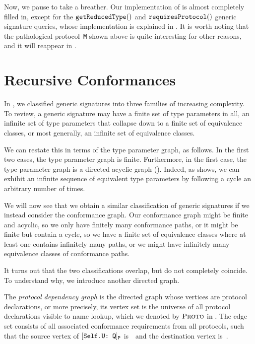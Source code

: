 \documentclass[../generics]{subfiles}
\begin{document}
Now, we pause to take a breather. Our implementation of  is almost completely filled in, except for the $\texttt{getReducedType}()$ and $\texttt{requiresProtocol}()$ generic signature queries, whose implementation is explained in . It is worth noting that the pathological protocol~\texttt{M} shown above is quite interesting for other reasons, and it will reappear in .

\section{Recursive Conformances}\label{recursive conformances}

In , we classified generic signatures into three families of increasing complexity. To review, a generic signature may have a finite set of type parameters in all, an infinite set of type parameters that collapse down to a finite set of equivalence classes, or most generally, an infinite set of equivalence classes.

We can restate this in terms of the type parameter graph, as follows. In the first two cases, the type parameter graph is finite. Furthermore, in the first case, the type parameter graph is a directed acyclic graph (). Indeed, as  shows, we can exhibit an infinite sequence of equivalent type parameters by following a cycle an arbitrary number of times.

We will now see that we obtain a similar classification of generic signatures if we instead consider the conformance graph. Our conformance graph might be finite and acyclic, so we only have finitely many conformance paths, or it might be finite but contain a cycle, so we have a finite set of equivalence classes where at least one contains infinitely many paths, or we might have infinitely many equivalence classes of conformance paths.

It turns out that the two classifications overlap, but do not completely coincide. To understand why, we introduce another directed graph.

\begin{definition}\label{protocol dependency graph def}
The \emph{protocol dependency graph} is the directed graph whose vertices are protocol declarations, or more precisely, its vertex set is the universe of all protocol declarations visible to name lookup, which we denoted by $\textsc{Proto}$ in . The edge set consists of all associated conformance requirements from all protocols, such that the source vertex of $[\texttt{Self.U:~Q}]_{\texttt{P}}$ is~\tP\ and the destination vertex is~\tQ.
\end{definition}
\end{document}
